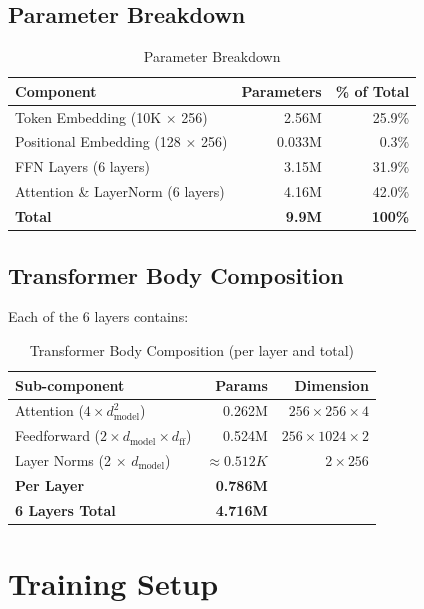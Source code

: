 \documentclass[11pt,a4paper]{article}
\begin{document}
\subsection{Parameter Breakdown}

\begin{table}[H]
\centering
\begin{tabular}{lrr}
\toprule
\textbf{Component} & \textbf{Parameters} & \textbf{\% of Total} \\
\midrule
Token Embedding (10K $\times$ 256) & 2.56M & 25.9\% \\
Positional Embedding (128 $\times$ 256) & 0.033M & 0.3\% \\
FFN Layers (6 layers) & 3.15M & 31.9\% \\
Attention \& LayerNorm (6 layers) & 4.16M & 42.0\% \\
\midrule
\textbf{Total} & \textbf{9.9M} & \textbf{100\%} \\
\bottomrule
\end{tabular}
\caption{Parameter Breakdown}
\end{table}

\subsection{Transformer Body Composition}

Each of the 6 layers contains:

\begin{table}[H]
\centering
\begin{tabular}{lrr}
\toprule
\textbf{Sub-component} & \textbf{Params} & \textbf{Dimension} \\
\midrule
Attention ($4 \times d_{\text{model}}^2$) & 0.262M & $256 \times 256 \times 4$ \\
Feedforward ($2 \times d_{\text{model}} \times d_{\text{ff}}$) & 0.524M & $256 \times 1024 \times 2$ \\
Layer Norms (2 $\times$ $d_{\text{model}}$) & $\approx 0.512K$ & $2 \times 256$ \\
\midrule
\textbf{Per Layer} & \textbf{0.786M} & \\
\midrule
\textbf{6 Layers Total} & \textbf{4.716M} & \\
\bottomrule
\end{tabular}
\caption{Transformer Body Composition (per layer and total)}
\end{table}

\section{Training Setup}
\end{document}
